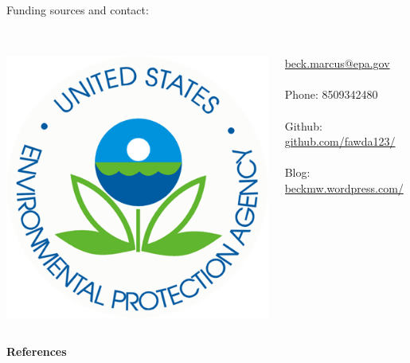 \documentclass[serif]{beamer}\usepackage[]{graphicx}\usepackage[]{color}
\begin{document}
\begin{frame}
\begin{columns}
\begin{column}{0.3\textwidth}
\begin{center}
{}
\end{center}
\end{column}
\end{columns}
\vfill
Funding sources and contact:\\~\\
\begin{columns}
\begin{column}{0.5\textwidth}
\centerline{\includegraphics[width=0.4\linewidth]{fig/epa_logo.png}}
\end{column}
\begin{column}{0.5\textwidth}
\scriptsize
\href{mailto:beck.marcus@epa.gov}{beck.marcus@epa.gov} \\~\\
Phone: 8509342480 \\~\\
Github: \href{https://github.com/fawda123/}{github.com/fawda123/} \\~\\
Blog: \href{http://beckmw.wordpress.com/}{beckmw.wordpress.com/}
\end{column}
\end{columns}
\vspace{0.2in}
\end{frame}

\begin{frame}[allowframebreaks,t]{\textbf{References}}
\tiny
{}


\end{frame}
\end{document}
